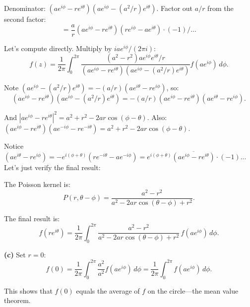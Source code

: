 \documentclass[12pt]{article}
\begin{document}
Denominator: $(ae^{i\phi}-re^{i\theta})(ae^{i\phi}-(a^2/r)e^{i\theta})$. Factor out $a/r$ from the second factor:
\[
= \frac{a}{r}(ae^{i\phi}-re^{i\theta})(re^{i\phi}-ae^{i\theta}) \cdot (-1)/\ldots
\]

Let's compute directly. Multiply by $iae^{i\phi}/(2\pi i)$:
\[
f(z) = \frac{1}{2\pi}\int_0^{2\pi}\frac{(a^2-r^2)ae^{i\phi}e^{i\theta}/r}{(ae^{i\phi}-re^{i\theta})(ae^{i\phi}-(a^2/r)e^{i\theta})}f(ae^{i\phi})\,d\phi.
\]

Note $(ae^{i\phi}-(a^2/r)e^{i\theta}) = -(a/r)(ae^{i\theta}-re^{i\phi})$, so:
\[
(ae^{i\phi}-re^{i\theta})(ae^{i\phi}-(a^2/r)e^{i\theta}) = -(a/r)(ae^{i\phi}-re^{i\theta})(ae^{i\theta}-re^{i\phi}).
\]

And $|ae^{i\phi}-re^{i\theta}|^2 = a^2 + r^2 - 2ar\cos(\phi-\theta)$. Also:
$(ae^{i\phi}-re^{i\theta})(ae^{-i\phi}-re^{-i\theta}) = a^2+r^2-2ar\cos(\phi-\theta)$.

Notice $(ae^{i\theta}-re^{i\phi}) = -e^{i(\phi+\theta)}(re^{-i\theta}-ae^{-i\phi}) = e^{i(\phi+\theta)}\overline{(ae^{i\phi}-re^{i\theta})} \cdot(-1)$... Let's just verify the final result:

The Poisson kernel is:
\[
P(r,\theta-\phi) = \frac{a^2 - r^2}{a^2 - 2ar\cos(\theta-\phi)+r^2}.
\]

The final result is:
\[
\boxed{f(re^{i\theta}) = \frac{1}{2\pi}\int_0^{2\pi}\frac{a^2-r^2}{a^2-2ar\cos(\theta-\phi)+r^2}\,f(ae^{i\phi})\,d\phi.}
\]

\textbf{(c)} Set $r = 0$:
\[
f(0) = \frac{1}{2\pi}\int_0^{2\pi}\frac{a^2}{a^2}f(ae^{i\phi})\,d\phi = \frac{1}{2\pi}\int_0^{2\pi}f(ae^{i\phi})\,d\phi.
\]

This shows that $f(0)$ equals the average of $f$ on the circle---the mean value theorem.
\end{document}
